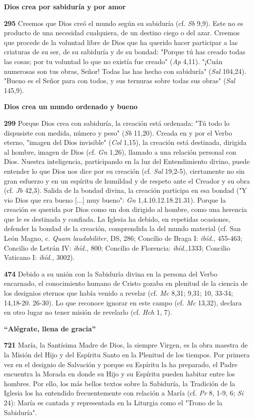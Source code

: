 \documentclass[]{article}
\begin{document}
\textbf{Dios crea por sabiduría y por amor}

\textbf{295} Creemos que Dios creó el mundo según su sabiduría (cf.
\emph{Sb} 9,9). Este no es producto de una necesidad cualquiera, de un
destino ciego o del azar. Creemos que procede de la voluntad libre de
Dios que ha querido hacer participar a las criaturas de su ser, de su
sabiduría y de su bondad: "Porque tú has creado todas las cosas; por tu
voluntad lo que no existía fue creado" (\emph{Ap} 4,11). "¡Cuán
numerosas son tus obras, Señor! Todas las has hecho con sabiduría"
(\emph{Sal} 104,24). "Bueno es el Señor para con todos, y sus ternuras
sobre todas sus obras" (\emph{Sal} 145,9).

\textbf{Dios crea un mundo ordenado y bueno}

\textbf{299} Porque Dios crea con sabiduría, la creación está ordenada:
"Tú todo lo dispusiste con medida, número y peso" (\emph{Sb} 11,20).
Creada en y por el Verbo eterno, "imagen del Dios invisible" (\emph{Col}
1,15), la creación está destinada, dirigida al hombre, imagen de Dios
(cf. \emph{Gn} 1,26), llamado a una relación personal con Dios. Nuestra
inteligencia, participando en la luz del Entendimiento divino, puede
entender lo que Dios nos dice por su creación (cf. \emph{Sal} 19,2-5),
ciertamente no sin gran esfuerzo y en un espíritu de humildad y de
respeto ante el Creador y su obra (cf. \emph{Jb} 42,3). Salida de la
bondad divina, la creación participa en esa bondad ("Y vio Dios que era
bueno {[}...{]} muy bueno": \emph{Gn} 1,4.10.12.18.21.31). Porque la
creación es querida por Dios como un don dirigido al hombre, como una
herencia que le es destinada y confiada. La Iglesia ha debido, en
repetidas ocasiones, defender la bondad de la creación, comprendida la
del mundo material (cf. San León Magno, c. \emph{Quam laudabiliter}, DS,
286; Concilio de Braga I: \emph{ibíd.}, 455-463; Concilio de Letrán IV:
\emph{ibíd.,} 800; Concilio de Florencia: \emph{ibíd.,}1333; Concilio
Vaticano I: \emph{ibíd.,} 3002).

\textbf{474} Debido a su unión con la Sabiduría divina en la persona del
Verbo encarnado, el conocimiento humano de Cristo gozaba en plenitud de
la ciencia de los designios eternos que había venido a revelar (cf.
\emph{Mc} 8,31; 9,31; 10, 33-34; 14,18-20. 26-30). Lo que reconoce
ignorar en este campo (cf. \emph{Mc} 13,32), declara en otro lugar no
tener misión de revelarlo (cf. \emph{Hch} 1, 7).

\textbf{``Alégrate, llena de gracia''}

\textbf{721} María, la Santísima Madre de Dios, la siempre Virgen, es la
obra maestra de la Misión del Hijo y del Espíritu Santo en la Plenitud
de los tiempos. Por primera vez en el designio de Salvación y porque su
Espíritu la ha preparado, el Padre encuentra la Morada en donde su Hijo
y su Espíritu pueden habitar entre los hombres. Por ello, los más bellos
textos sobre la Sabiduría, la Tradición de la Iglesia los ha entendido
frecuentemente con relación a María (cf. \emph{Pr} 8, 1-9, 6; \emph{Si}
24): María es cantada y representada en la Liturgia como el "Trono de la
Sabiduría".
\end{document}
